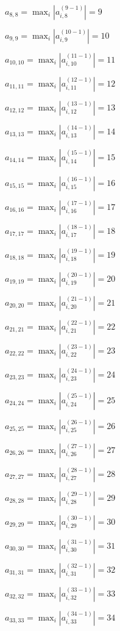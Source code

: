 \documentclass[a4paper,12pt]{article}
\begin{document}
$a _{ 8, 8 } =  \max _i |a _{ i, 8 } ^{ (9 - 1) } | = 9$

$a _{ 9, 9 } =  \max _i |a _{ i, 9 } ^{ (10 - 1) } | = 10$

$a _{ 10, 10 } =  \max _i |a _{ i, 10 } ^{ (11 - 1) } | = 11$

$a _{ 11, 11 } =  \max _i |a _{ i, 11 } ^{ (12 - 1) } | = 12$

$a _{ 12, 12 } =  \max _i |a _{ i, 12 } ^{ (13 - 1) } | = 13$

$a _{ 13, 13 } =  \max _i |a _{ i, 13 } ^{ (14 - 1) } | = 14$

$a _{ 14, 14 } =  \max _i |a _{ i, 14 } ^{ (15 - 1) } | = 15$

$a _{ 15, 15 } =  \max _i |a _{ i, 15 } ^{ (16 - 1) } | = 16$

$a _{ 16, 16 } =  \max _i |a _{ i, 16 } ^{ (17 - 1) } | = 17$

$a _{ 17, 17 } =  \max _i |a _{ i, 17 } ^{ (18 - 1) } | = 18$

$a _{ 18, 18 } =  \max _i |a _{ i, 18 } ^{ (19 - 1) } | = 19$

$a _{ 19, 19 } =  \max _i |a _{ i, 19 } ^{ (20 - 1) } | = 20$

$a _{ 20, 20 } =  \max _i |a _{ i, 20 } ^{ (21 - 1) } | = 21$

$a _{ 21, 21 } =  \max _i |a _{ i, 21 } ^{ (22 - 1) } | = 22$

$a _{ 22, 22 } =  \max _i |a _{ i, 22 } ^{ (23 - 1) } | = 23$

$a _{ 23, 23 } =  \max _i |a _{ i, 23 } ^{ (24 - 1) } | = 24$

$a _{ 24, 24 } =  \max _i |a _{ i, 24 } ^{ (25 - 1) } | = 25$

$a _{ 25, 25 } =  \max _i |a _{ i, 25 } ^{ (26 - 1) } | = 26$

$a _{ 26, 26 } =  \max _i |a _{ i, 26 } ^{ (27 - 1) } | = 27$

$a _{ 27, 27 } =  \max _i |a _{ i, 27 } ^{ (28 - 1) } | = 28$

$a _{ 28, 28 } =  \max _i |a _{ i, 28 } ^{ (29 - 1) } | = 29$

$a _{ 29, 29 } =  \max _i |a _{ i, 29 } ^{ (30 - 1) } | = 30$

$a _{ 30, 30 } =  \max _i |a _{ i, 30 } ^{ (31 - 1) } | = 31$

$a _{ 31, 31 } =  \max _i |a _{ i, 31 } ^{ (32 - 1) } | = 32$

$a _{ 32, 32 } =  \max _i |a _{ i, 32 } ^{ (33 - 1) } | = 33$

$a _{ 33, 33 } =  \max _i |a _{ i, 33 } ^{ (34 - 1) } | = 34$
\end{document}

